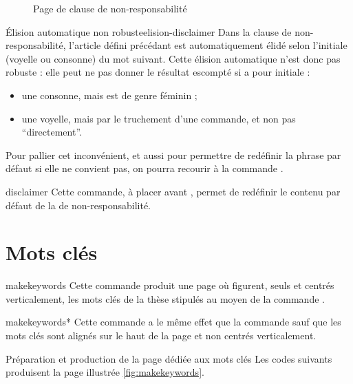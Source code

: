 \begin{figure}[htbp]
  \centering
  \caption{Page de clause de non-responsabilité}
  \label{fig:disclaimerpage}
\end{figure}

\begin{dbwarning}{Élision automatique non robuste}{elision-disclaimer}
  Dans la clause de non-responsabilité, l'article défini précédant
   est automatiquement élidé selon l'initiale (voyelle ou
  consonne) du mot suivant. Cette élision automatique n'est donc pas robuste :
  elle peut ne pas donner le résultat escompté si  a pour
  initiale :
  \begin{itemize}
  \item une consonne, mais est de genre féminin ;
  \item une voyelle, mais par le truchement d'une commande\commandeacronyme, et
    non pas \enquote{directement}.
  \end{itemize}
\end{dbwarning}

Pour pallier cet inconvénient, et aussi pour permettre de redéfinir la phrase
par défaut si elle ne convient pas, on pourra recourir à la commande
.

\begin{docCommand}{disclaimer}{}
  Cette commande, à placer avant , permet de redéfinir
  le contenu par défaut de la  de non-responsabilité.
\end{docCommand}

\section{Mots clés}\label{sec:mots-cles}

\begin{docCommand}{makekeywords}{}
  Cette commande produit une page où figurent, seuls et centrés
  verticalement, les mots clés de la thèse stipulés au moyen de la commande
  .
\end{docCommand}
%
\begin{docCommand}{makekeywords*}{}
  Cette commande a le même effet que la commande
   sauf que les mots clés sont alignés sur le haut de la
  page et non centrés verticalement.
\end{docCommand}

\begin{dbexample}{Préparation et production de la page dédiée aux mots clés}{}
  Les codes suivants produisent la page illustrée \vref{fig:makekeywords}.
%
\end{dbexample}

